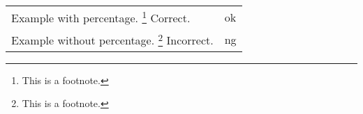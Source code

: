 \documentclass[preview]{standalone}
\newcommand{\tA}[1]{\textcolor{cA}{#1}}
\newcommand{\tD}[1]{\textcolor{cD}{#1}}
\begin{document}
\begin{table}[h]
    \centering
    \begin{tabular}{ll}
        Example with percentage.%
        \footnote{This is a footnote.}
        Correct.   & \tA{ok} \\
        Example without percentage.
        \footnote{This is a footnote.}
        Incorrect. & \tD{ng} \\
    \end{tabular}
\end{table}
\end{document}
